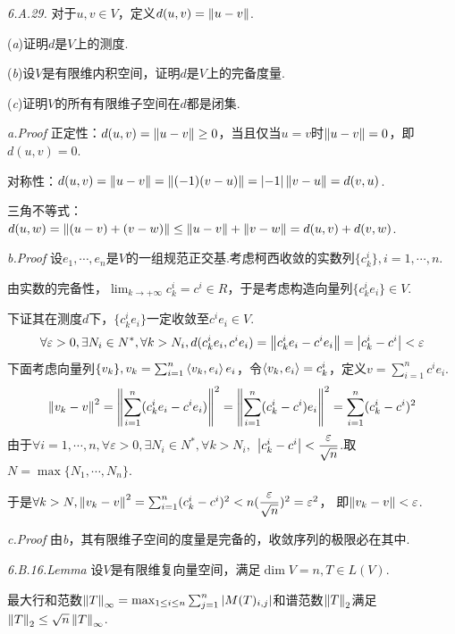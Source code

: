 \textit{6.A.29.}
对于\(u,v \in V\)，定义\(d(u,v)=\left\lVert u-v \right\rVert\).

(\textit{a})证明\(d\)是\(V\)上的测度.

(\textit{b})设\(V\)是有限维内积空间，证明\(d\)是\(V\)上的完备度量.

(\textit{c})证明\(V\)的所有有限维子空间在\(d\)都是闭集.

\textit{a.Proof}
正定性：\(d(u,v)=\left\lVert u-v \right\rVert \geq 0\)，当且仅当\(u=v\)时\(\left\lVert u-v \right\rVert=0\)，即\(d(u,v)=0\).

对称性：\(d(u,v)=\left\lVert u-v \right\rVert=\left\lVert (-1)(v-u) \right\rVert=\left\lvert -1 \right\rvert\left\lVert v-u \right\rVert=d(v,u)\).

三角不等式：\(d(u,w)=\left\lVert (u-v)+(v-w) \right\rVert \leq \left\lVert u-v \right\rVert+\left\lVert v-w \right\rVert=d(u,v)+d(v,w)\).

\textit{b.Proof}
设\(e_1,\cdots,e_n\)是\(V\)的一组规范正交基.考虑柯西收敛的实数列\(\{c_k^i\},i=1,\cdots,n\).

由实数的完备性，\(\lim_{k \rightarrow +\infty}c_k^i=c^i \in R\)，于是考虑构造向量列\(\{c_k^ie_i\} \in V\).

下证其在测度\(d\)下，\(\{c_k^ie_i\}\)一定收敛至\(c^ie_i \in V\).
    \begin{align*}
        \forall \varepsilon>0,\exists N_i \in N^*,\forall k>N_i,
        d(c_k^ie_i,c^ie_i)=\left\lVert c_k^ie_i-c^ie_i \right\rVert=\left\lvert c_k^i-c^i \right\rvert<\varepsilon
    \end{align*}
下面考虑向量列\(\{v_k\},v_k=\sum_{i=1}^n \left\langle v_k,e_i \right\rangle e_i\)，令\(\left\langle v_k,e_i \right\rangle=c_k^i\)，定义\(v=\sum_{i=1}^n c^ie_i\).
    \begin{align*}
        \left\lVert v_k-v \right\rVert^2=\left\lVert \sum_{i=1}^n(c_k^ie_i-c^ie_i) \right\rVert^2=\left\lVert \sum_{i=1}^n(c_k^i-c^i)e_i \right\rVert^2
        =\sum_{i=1}^n(c_k^i-c^i)^2
    \end{align*}
由于\(\forall i=1,\cdots,n,\forall \varepsilon>0,\exists N_i \in N^*,\forall k>N_i,\)
\(\left\lvert c_k^i-c^i \right\rvert<\dfrac{\varepsilon}{\sqrt{n}}\).取\(N=\max\{N_1,\cdots,N_n\}\).

于是\(\forall k>N,\left\lVert v_k-v \right\rVert^2=\sum_{i=1}^n(c_k^i-c^i)^2<n(\dfrac{\varepsilon}{\sqrt{n}})^2=\varepsilon^2\)，
即\(\left\lVert v_k-v \right\rVert<\varepsilon\).

\textit{c.Proof}
由\textit{b}，其有限维子空间的度量是完备的，收敛序列的极限必在其中.

\hspace*{\fill}

\textit{6.B.16.Lemma}
设\(V\)是有限维复向量空间，满足\(\dim V=n,T \in L(V)\).

最大行和范数\(\left\lVert T \right\rVert_{\infty}=\max_{1 \leq i \leq n} \sum_{j=1}^n \left\lvert M(T)_{i,j} \right\rvert\)和谱范数\(\left\lVert T \right\rVert_2\)满足
\(\left\lVert T \right\rVert_2 \leq \sqrt{n}\left\lVert T \right\rVert_{\infty}\).

